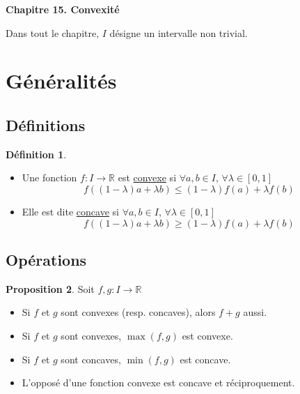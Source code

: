 \documentclass[10pt,a4paper]{article}
\theoremstyle{definition}
\newtheorem{proposition}{Proposition}[section]
\newtheorem{definition}[proposition]{Définition}
\begin{document}
\renewcommand{\labelitemi}{$*$}
\renewcommand{\labelenumi}{(\roman{enumi})}
\begin{center}
{\Large \textbf{Chapitre 15. Convexité}}
\end{center}
Dans tout le chapitre, $I$ désigne un intervalle non trivial.

\section{Généralités}
\subsection{Définitions}
\begin{definition}
\hfill
\begin{itemize}
\item Une fonction $f: I \to \mathbb{R}$ est \uline{convexe} si $\forall a, b \in I$, $\forall \lambda \in [0, 1]$ 
\[f((1 - \lambda)a + \lambda b) \leq (1 - \lambda)f(a) + \lambda f(b)\]
\item Elle est dite \uline{concave} si $\forall a, b \in I$, $\forall \lambda \in [0, 1]$
\[f((1 - \lambda)a + \lambda b) \geq (1 - \lambda)f(a) + \lambda f(b)\]
\end{itemize}
\end{definition}

\subsection{Opérations}
\begin{proposition}
Soit $f, g: I \to \mathbb{R}$
\begin{itemize}
\item Si $f$ et $g$ sont convexes (resp. concaves), alors $f + g$ aussi.
\item Si $f$ et $g$ sont convexes, $\max(f, g)$ est convexe.
\item Si $f$ et $g$ sont concaves, $\min(f, g)$ est concave.
\item L'opposé d'une fonction convexe est concave et réciproquement.
\end{itemize}
\end{proposition}
\end{document}
